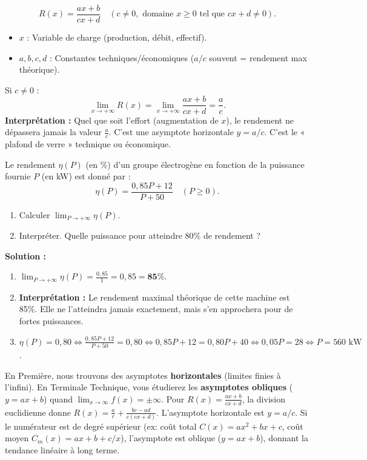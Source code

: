 \documentclass[11pt]{article}
\newcommand{\cle}[1]{{\popxbold\color{popdark}#1}}
\begin{document}
\begin{definition}
\[ R(x) = \frac{ax + b}{cx + d} \quad (c \neq 0, \text{ domaine } x \ge 0 \text{ tel que } cx+d \neq 0). \]
\begin{itemize}
    \item $x$ : Variable de charge (production, débit, effectif).
    \item $a, b, c, d$ : Constantes techniques/économiques ($a/c$ souvent = rendement max théorique).
\end{itemize}
\end{definition}

\begin{propriete}
Si $c \neq 0$ :
\[ \lim_{x \to +\infty} R(x) = \lim_{x \to +\infty} \frac{ax + b}{cx + d} = \frac{a}{c}. \]
\textbf{Interprétation :} Quel que soit l'effort (augmentation de $x$), le rendement ne dépassera jamais la valeur $\frac{a}{c}$. C'est une \cle{asymptote horizontale} $y = a/c$. C'est le « plafond de verre » technique ou économique.
\end{propriete}

\begin{exemplebox}
Le rendement $\eta(P)$ (en \%) d'un groupe électrogène en fonction de la puissance fournie $P$ (en kW) est donné par :
\[ \eta(P) = \frac{0,85 P + 12}{P + 50} \quad (P \ge 0). \]
\begin{enumerate}
    \item Calculer $\lim_{P\to+\infty} \eta(P)$.
    \item Interpréter. Quelle puissance pour atteindre 80\% de rendement ?
\end{enumerate}
\textbf{Solution :}
\begin{enumerate}
    \item $\lim_{P\to+\infty} \eta(P) = \frac{0,85}{1} = 0,85 = \textbf{85\%}$.
    \item \textbf{Interprétation :} Le rendement maximal théorique de cette machine est 85\%. Elle ne l'atteindra jamais exactement, mais s'en approchera pour de fortes puissances.
    \item $\eta(P) = 0,80 \iff \frac{0,85P+12}{P+50} = 0,80 \iff 0,85P+12 = 0,80P + 40 \iff 0,05P = 28 \iff P = 560 \text{ kW}$.
\end{enumerate}
\end{exemplebox}

\begin{savaistu}
En Première, nous trouvons des asymptotes \textbf{horizontales} (limites finies à l'infini). En Terminale Technique, vous étudierez les \textbf{asymptotes obliques} ($y = ax + b$) quand $\lim_{x\to\infty} f(x) = \pm\infty$. Pour $R(x) = \frac{ax+b}{cx+d}$, la division euclidienne donne $R(x) = \frac{a}{c} + \frac{bc-ad}{c(cx+d)}$. L'asymptote horizontale est $y = a/c$. Si le numérateur est de degré supérieur (ex: coût total $C(x) = ax^2+bx+c$, coût moyen $C_m(x) = ax+b+c/x$), l'asymptote est oblique ($y=ax+b$), donnant la tendance linéaire à long terme.
\end{savaistu}
\end{document}
